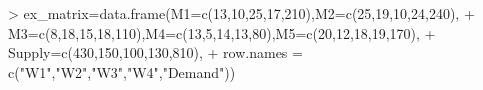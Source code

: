 \documentclass{article}
\begin{document}


\begin{Schunk}
\begin{Sinput}
> ex_matrix=data.frame(M1=c(13,10,25,17,210),M2=c(25,19,10,24,240),
+                      M3=c(8,18,15,18,110),M4=c(13,5,14,13,80),M5=c(20,12,18,19,170),
+                      Supply=c(430,150,100,130,810),
+                      row.names = c("W1","W2","W3","W4","Demand"))
\end{Sinput}
\end{Schunk}
\end{document}
